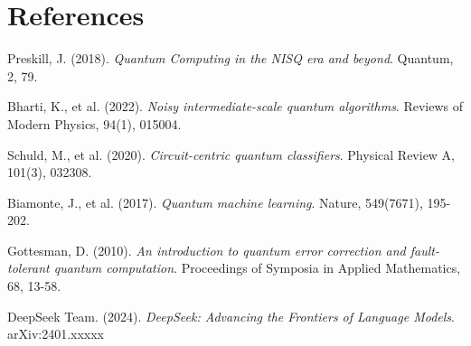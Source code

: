 \documentclass{article}
\begin{document}
\section{References}
\begin{thebibliography}{9}

Preskill, J. (2018).
\textit{Quantum Computing in the NISQ era and beyond}.
Quantum, 2, 79.

Bharti, K., et al. (2022).
\textit{Noisy intermediate-scale quantum algorithms}.
Reviews of Modern Physics, 94(1), 015004.

Schuld, M., et al. (2020).
\textit{Circuit-centric quantum classifiers}.
Physical Review A, 101(3), 032308.

Biamonte, J., et al. (2017).
\textit{Quantum machine learning}.
Nature, 549(7671), 195-202.

Gottesman, D. (2010).
\textit{An introduction to quantum error correction and fault-tolerant quantum computation}.
Proceedings of Symposia in Applied Mathematics, 68, 13-58.

DeepSeek Team. (2024).
\textit{DeepSeek: Advancing the Frontiers of Language Models}.
arXiv:2401.xxxxx

\end{thebibliography}
\end{document}

